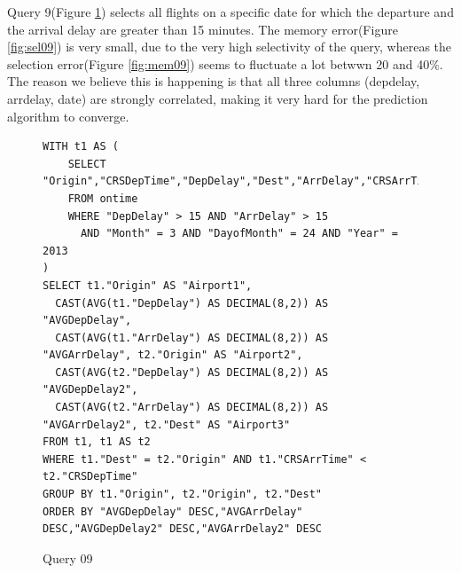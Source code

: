 Query 9(Figure \ref{sel:sql09}) selects all flights on a specific date
for which the departure and the arrival delay are greater than 15 minutes.
The memory error(Figure \ref{fig:sel09}) is very small,
due to the very high selectivity of the query,
whereas the selection error(Figure \ref{fig:mem09}) seems to fluctuate a lot
betwwn 20 and 40\%. The reason we believe this is happening is that all three columns
(depdelay, arrdelay, date) are strongly correlated, making it very hard
for the prediction algorithm to converge.

\begin{figure}[!htb]
\begin{lstlisting}[frame=single]
WITH t1 AS (
    SELECT "Origin","CRSDepTime","DepDelay","Dest","ArrDelay","CRSArrTime"
    FROM ontime
    WHERE "DepDelay" > 15 AND "ArrDelay" > 15
      AND "Month" = 3 AND "DayofMonth" = 24 AND "Year" = 2013
)
SELECT t1."Origin" AS "Airport1",
  CAST(AVG(t1."DepDelay") AS DECIMAL(8,2)) AS "AVGDepDelay",
  CAST(AVG(t1."ArrDelay") AS DECIMAL(8,2)) AS "AVGArrDelay", t2."Origin" AS "Airport2",
  CAST(AVG(t2."DepDelay") AS DECIMAL(8,2)) AS "AVGDepDelay2",
  CAST(AVG(t2."ArrDelay") AS DECIMAL(8,2)) AS "AVGArrDelay2", t2."Dest" AS "Airport3"
FROM t1, t1 AS t2
WHERE t1."Dest" = t2."Origin" AND t1."CRSArrTime" < t2."CRSDepTime"
GROUP BY t1."Origin", t2."Origin", t2."Dest"
ORDER BY "AVGDepDelay" DESC,"AVGArrDelay" DESC,"AVGDepDelay2" DESC,"AVGArrDelay2" DESC
\end{lstlisting}
  \caption{Query 09}
  \label{sel:sql09}
\end{figure}

